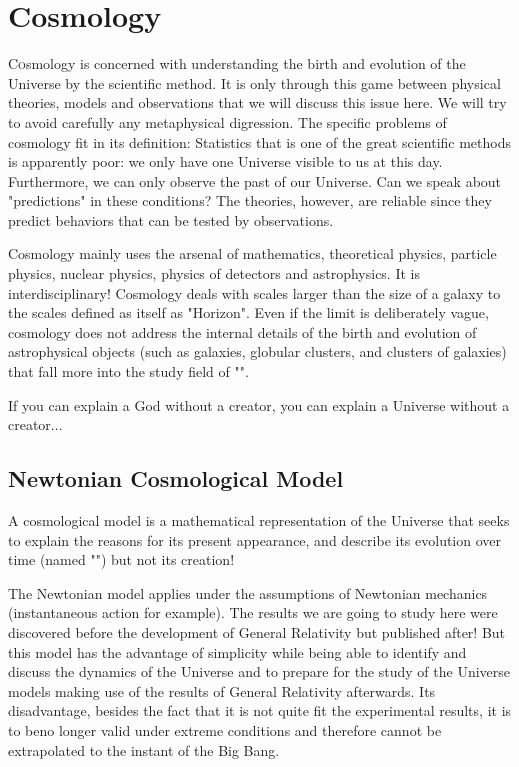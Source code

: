 	\newpage
	\thispagestyle{empty}
	\mbox{}
	\section{Cosmology}
	\lettrine[lines=4]{\color{BrickRed}C}osmology is concerned with understanding the birth and evolution of the Universe by the scientific method. It is only through this game between physical theories, models and observations that we will discuss this issue here. We will try to avoid carefully any metaphysical digression. The specific problems of cosmology fit in its definition: Statistics that is one of the great scientific methods is apparently poor: we only have one Universe visible to us at this day. Furthermore, we can only observe the past of our Universe. Can we speak about "predictions" in these conditions? The theories, however, are reliable since they predict behaviors that can be tested by observations.
	
	Cosmology mainly uses the arsenal of mathematics, theoretical physics, particle physics, nuclear physics, physics of detectors and astrophysics. It is interdisciplinary! Cosmology deals with scales larger than the size of a galaxy to the scales defined as itself as "Horizon". Even if the limit is deliberately vague, cosmology does not address the internal details of the birth and evolution of astrophysical objects (such as galaxies, globular clusters, and clusters of galaxies) that fall more into the study field of "".
	
	\begin{fquote}[]If you can explain a God without a creator, you can explain a Universe without a creator...
 	\end{fquote}
	
	\subsection{Newtonian Cosmological Model}
	A cosmological model is a mathematical representation of the Universe that seeks to explain the reasons for its present appearance, and describe its evolution over time (named "") but not its creation!
	
	The Newtonian model applies under the assumptions of Newtonian mechanics (instantaneous action for example). The results we are going to study here were discovered before the development of General Relativity but published after! But this model has the advantage of simplicity while being able to identify and discuss the dynamics of the Universe and to prepare for the study of the Universe models making use of the results of General Relativity afterwards. Its disadvantage, besides the fact that it is not quite fit the experimental results, it is to beno longer valid under extreme conditions and therefore cannot be extrapolated to the instant of the Big Bang.
	
